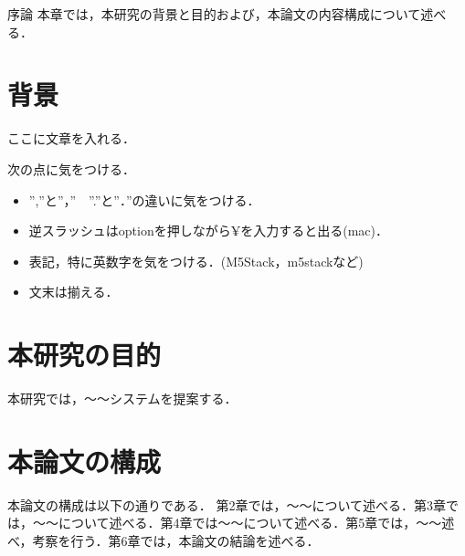 \chapterhead
{序論}
{本章では，本研究の背景と目的および，本論文の内容構成について述べる．}



\section{背景}
ここに文章を入れる．\par
次の点に気をつける．
\begin{itemize}
  \item ”,”と”，”　”.”と”．”の違いに気をつける．
  \item 逆スラッシュはoptionを押しながら¥を入力すると出る(mac)．
  \item 表記，特に英数字を気をつける．(M5Stack，m5stackなど)
  \item 文末は揃える．
\end{itemize}



\section{本研究の目的}
本研究では，〜〜システムを提案する．

\newpage
\section{本論文の構成}
本論文の構成は以下の通りである．
第2章では，〜〜について述べる．第3章では，〜〜について述べる．第4章では〜〜について述べる．第5章では，〜〜述べ，考察を行う．第6章では，本論文の結論を述べる．
\newpage